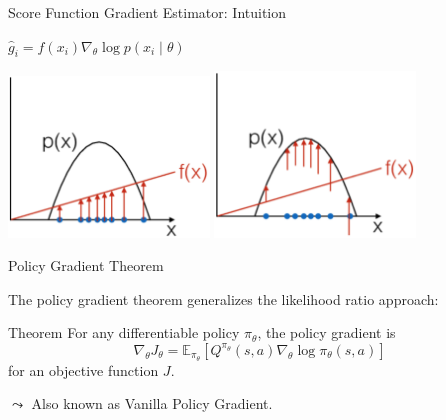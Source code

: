 \documentclass[aspectratio=169]{../latex_main/tntbeamer}  %
\begin{document}
\begin{frame}[c]{Score Function Gradient Estimator: Intuition}
	

\centering
$\hat{g}_i = f(x_i) \nabla_\theta \log p(x_i \mid \theta)$
\bigskip

\includegraphics[width=0.4\textwidth]{images/scoring_function_1.png}
\pause
\includegraphics[width=0.4\textwidth]{images/scoring_function_2.png}
	
\end{frame}
\begin{frame}[c]{Policy Gradient Theorem}
	
The policy gradient theorem generalizes the likelihood ratio approach:
\begin{block}{Theorem}
For any differentiable policy $\pi_\theta$, the policy gradient is
$$\nabla_\theta J_\theta= \mathbb{E}_{\pi_\theta} [Q^{\pi_\theta}(s,a) \nabla_\theta \log \pi_\theta(s,a) ] $$
for an objective function $J$.
\end{block}

$\leadsto$ Also known as Vanilla Policy Gradient.
 
\end{frame}
\end{document}
